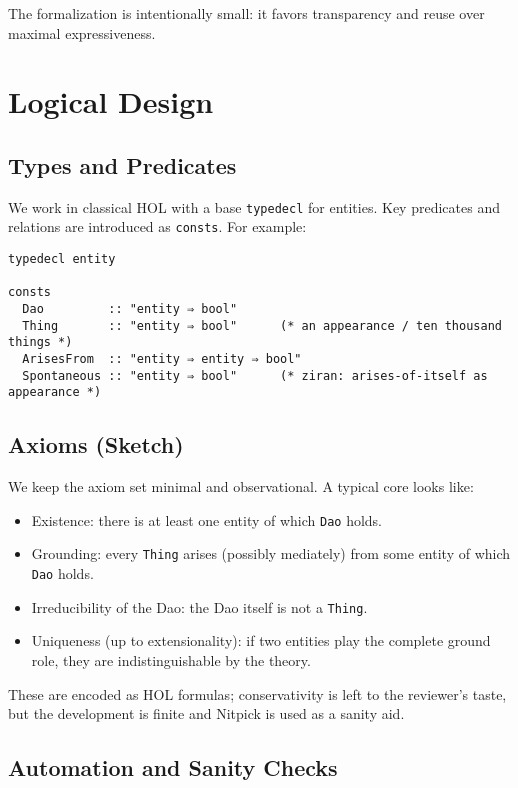 \documentclass[11pt,a4paper]{article}
\begin{document}
The formalization is intentionally small: it favors transparency and reuse over
maximal expressiveness.

\section{Logical Design}

\subsection{Types and Predicates}

We work in classical HOL with a base \texttt{typedecl} for entities. Key
predicates and relations are introduced as \texttt{consts}. For example:
\begin{lstlisting}
typedecl entity

consts
  Dao         :: "entity ⇒ bool"
  Thing       :: "entity ⇒ bool"      (* an appearance / ten thousand things *)
  ArisesFrom  :: "entity ⇒ entity ⇒ bool"
  Spontaneous :: "entity ⇒ bool"      (* ziran: arises-of-itself as appearance *)
\end{lstlisting}

\subsection{Axioms (Sketch)}

We keep the axiom set minimal and observational. A typical core looks like:
\begin{itemize}
  \item Existence: there is at least one entity of which \texttt{Dao} holds.
  \item Grounding: every \texttt{Thing} arises (possibly mediately) from some
        entity of which \texttt{Dao} holds.
  \item Irreducibility of the Dao: the Dao itself is not a \texttt{Thing}.
  \item Uniqueness (up to extensionality): if two entities play the complete
        ground role, they are indistinguishable by the theory.
\end{itemize}
These are encoded as HOL formulas; conservativity is left to the reviewer’s
taste, but the development is finite and Nitpick is used as a sanity aid.

\subsection{Automation and Sanity Checks}
\end{document}
